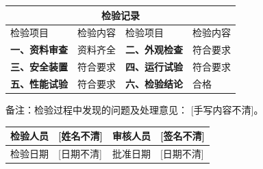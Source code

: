 \documentclass[UTF8,10pt,a4paper,fontset=fandol]{ctexart}
\newcommand{\fieldvalue}[1]{#1}
\newcommand{\handwritten}[1]{#1}
\begin{document}
\vspace{0.5em}

\begin{tabularx}{\textwidth}{|p{3.0cm}|X|p{3.0cm}|X|}
\hline
\multicolumn{4}{|c|}{检验记录}\\
\hline
检验项目 &
检验内容 &
检验项目 &
检验内容\\
\hline
\textbf{一、资料审查} &
\fieldvalue{资料齐全} &
\textbf{二、外观检查} &
\fieldvalue{符合要求} \\
\hline
\textbf{三、安全装置} &
\fieldvalue{符合要求} &
\textbf{四、运行试验} &
\fieldvalue{符合要求} \\
\hline
\textbf{五、性能试验} &
\fieldvalue{符合要求} &
\textbf{六、检验结论} &
\fieldvalue{合格} \\
\hline
\end{tabularx}

\vspace{0.5em}

\noindent
备注：检验过程中发现的问题及处理意见：
\fieldvalue{\handwritten{[手写内容不清]}}。

\vspace{1em}

\begin{tabularx}{\textwidth}{|p{3cm}|X|p{3cm}|X|}
\hline
检验人员 &
\fieldvalue{\handwritten{[姓名不清]}} &
审核人员 &
\fieldvalue{\handwritten{[签名不清]}} \\
\hline
检验日期 &
\fieldvalue{\handwritten{[日期不清]}} &
批准日期 &
\fieldvalue{\handwritten{[日期不清]}} \\
\hline
\end{tabularx}
\end{document}
